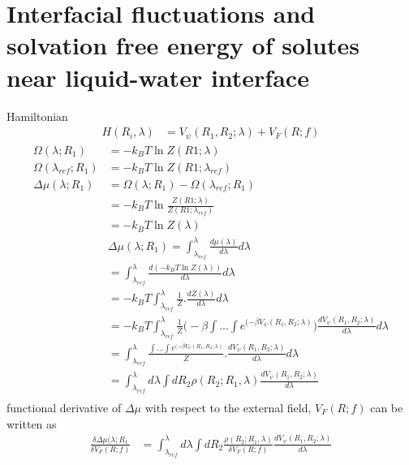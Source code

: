 \documentclass[a4paper]{article}
\begin{document}
\section{Interfacial fluctuations and solvation free energy of solutes near liquid-water interface}
Hamiltonian
\begin{align}
	H(R_i,\lambda)&= V_\psi(R_1, R_2 ;\lambda) + V_F(R;f)
\end{align}
\begin{align}
	\Omega(\lambda; R_1) &= -k_BT \ln Z(R1;\lambda)\\
	\Omega(\lambda_{ref}; R_1) &= -k_BT \ln Z(R1;\lambda_{ref})\\
	\Delta \mu(\lambda; R_1) &= \Omega(\lambda; R_1) - \Omega(\lambda_{ref}; R_1)\\
	&=  -k_BT \ln \frac{Z(R1;\lambda)}{Z(R1;\lambda_{ref})}\\
	&=  -k_BT \ln Z(\lambda)\\
	&\Delta \mu(\lambda; R_1)= \int_{\lambda_{ref}}^\lambda \frac{d \mu(\lambda)}{d\lambda} d \lambda\\
	&= \int_{\lambda_{ref}}^\lambda \frac{d(-k_BT \ln Z(\lambda))}{d\lambda} d \lambda\\
	&= -k_BT \int_{\lambda_{ref}}^\lambda \frac{1}{Z}.\frac{dZ(\lambda)}{d\lambda} d \lambda\\
	&= -k_BT \int_{\lambda_{ref}}^\lambda \frac{1}{Z}\big( -\beta\int. . .\int e^{(-\beta V_\psi(R_1, R_2 ;\lambda)} \big) \frac{dV_\psi(R_1, R_2 ;\lambda)}{d\lambda} d \lambda\\
	&= \int_{\lambda_{ref}}^\lambda \frac{\int. . .\int e^{(-\beta V_\psi(R_1, R_2 ;\lambda)}}{Z} . \frac{dV_\psi(R_1, R_2 ;\lambda)}{d\lambda} d \lambda\\
	&= \int_{\lambda_{ref}}^\lambda d \lambda \int dR_2 \rho(R_2;R_1,\lambda)\frac{dV_\psi(R_1, R_2 ;\lambda)}{d\lambda}\\
\end{align}
functional derivative of $\Delta \mu$ with respect to the external field, $V_F(R;f)$ can be written as
\begin{align}
	\frac{\delta \Delta \mu (\lambda;R_1}{\delta V_F(R;f)}&= \int_{\lambda_{ref}}^\lambda d \lambda \int dR_2 \frac{\rho(R_2;R_1,\lambda)}{\delta V_F(R;f)} \frac{dV_\psi(R_1, R_2 ;\lambda)}{d\lambda}\\
\end{align}
\end{document}
